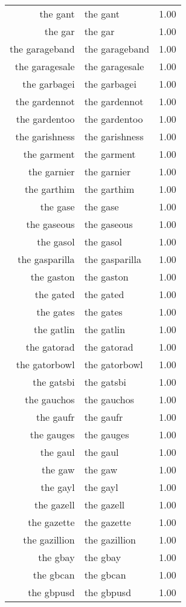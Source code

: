 \begin{table}[ht]
\begin{tabular}{rlr}
  the gant & the gant & 1.00 \\ 
  the gar & the gar & 1.00 \\ 
  the garageband & the garageband & 1.00 \\ 
  the garagesale & the garagesale & 1.00 \\ 
  the garbagei & the garbagei & 1.00 \\ 
  the gardennot & the gardennot & 1.00 \\ 
  the gardentoo & the gardentoo & 1.00 \\ 
  the garishness & the garishness & 1.00 \\ 
  the garment & the garment & 1.00 \\ 
  the garnier & the garnier & 1.00 \\ 
  the garthim & the garthim & 1.00 \\ 
  the gase & the gase & 1.00 \\ 
  the gaseous & the gaseous & 1.00 \\ 
  the gasol & the gasol & 1.00 \\ 
  the gasparilla & the gasparilla & 1.00 \\ 
  the gaston & the gaston & 1.00 \\ 
  the gated & the gated & 1.00 \\ 
  the gates & the gates & 1.00 \\ 
  the gatlin & the gatlin & 1.00 \\ 
  the gatorad & the gatorad & 1.00 \\ 
  the gatorbowl & the gatorbowl & 1.00 \\ 
  the gatsbi & the gatsbi & 1.00 \\ 
  the gauchos & the gauchos & 1.00 \\ 
  the gaufr & the gaufr & 1.00 \\ 
  the gauges & the gauges & 1.00 \\ 
  the gaul & the gaul & 1.00 \\ 
  the gaw & the gaw & 1.00 \\ 
  the gayl & the gayl & 1.00 \\ 
  the gazell & the gazell & 1.00 \\ 
  the gazette & the gazette & 1.00 \\ 
  the gazillion & the gazillion & 1.00 \\ 
  the gbay & the gbay & 1.00 \\ 
  the gbcan & the gbcan & 1.00 \\ 
  the gbpusd & the gbpusd & 1.00 \\ 

\end{tabular}
\end{table}
